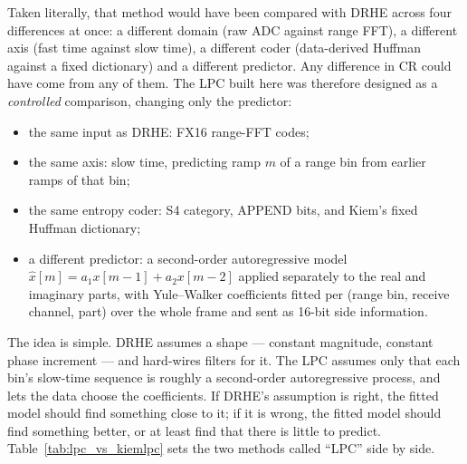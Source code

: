 Taken literally, that method would have been compared with DRHE across four
differences at once: a different domain (raw ADC against range FFT), a
different axis (fast time against slow time), a different coder (data-derived
Huffman against a fixed dictionary) and a different predictor. Any difference in
CR could have come from any of them. The LPC built here was therefore designed
as a \emph{controlled} comparison, changing only the predictor:

\begin{itemize}
\item the same input as DRHE: FX16 range-FFT codes;
\item the same axis: slow time, predicting ramp $m$ of a range bin from earlier
ramps of that bin;
\item the same entropy coder: S4 category, APPEND bits, and Kiem's fixed
Huffman dictionary;
\item a different predictor: a second-order autoregressive model
$\hat{x}[m] = a_1 x[m-1] + a_2 x[m-2]$ applied separately to the real and
imaginary parts, with Yule--Walker coefficients fitted per (range bin, receive
channel, part) over the whole frame and sent as 16-bit side information.
\end{itemize}

\noindent
The idea is simple. DRHE assumes a shape --- constant magnitude, constant phase
increment --- and hard-wires filters for it. The LPC assumes only that each
bin's slow-time sequence is roughly a second-order autoregressive process, and
lets the data choose the coefficients. If DRHE's assumption is right, the fitted
model should find something close to it; if it is wrong, the fitted model should
find something better, or at least find that there is little to predict.
Table~\ref{tab:lpc_vs_kiemlpc} sets the two methods called ``LPC'' side by side.

